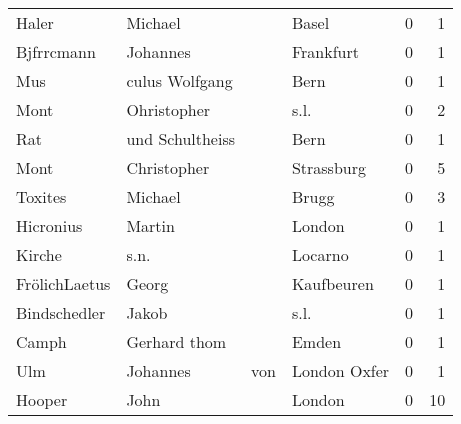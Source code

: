 \begin{center}
\begin{tiny}
\begin{longtabu}{llllrr}
                    Haler &                            Michael &             &                                       Basel &          0 &         1 \\
               Bjfrrcmann &                           Johannes &             &                                   Frankfurt &          0 &         1 \\
                      Mus &                     culus Wolfgang &             &                                        Bern &          0 &         1 \\
                     Mont &                        Ohristopher &             &                                        s.l. &          0 &         2 \\
                      Rat &                    und Schultheiss &             &                                        Bern &          0 &         1 \\
                     Mont &                        Christopher &             &                                  Strassburg &          0 &         5 \\
                  Toxites &                            Michael &             &                                       Brugg &          0 &         3 \\
                Hicronius &                             Martin &             &                                      London &          0 &         1 \\
                   Kirche &                               s.n. &             &                                     Locarno &          0 &         1 \\
            FrölichLaetus &                              Georg &             &                                  Kaufbeuren &          0 &         1 \\
             Bindschedler &                              Jakob &             &                                        s.l. &          0 &         1 \\
                    Camph &                       Gerhard thom &             &                                       Emden &          0 &         1 \\
                      Ulm &                           Johannes &         von &                                London Oxfer &          0 &         1 \\
                   Hooper &                               John &             &                                      London &          0 &        10 \\

\end{longtabu}
\end{tiny}
\end{center}
